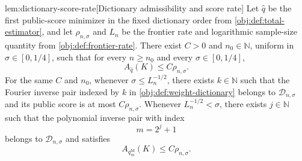 \documentclass[11pt]{article}
\begin{document}
\begin{lemmav}{lem:dictionary-score-rate}[Dictionary admissibility and score rate]
Let \(\widehat q\) be the first public-score minimizer in the fixed dictionary order from \cref{obj:def:total-estimator}, and let \(\rho_{n,\sigma}\) and \(L_n\) be the frontier rate and logarithmic sample-size quantity from \cref{obj:def:frontier-rate}. There exist \(C>0\) and \(n_0\in\mathbb N\), uniform in \(\sigma\in[0,1/4]\), such that for every \(n\ge n_0\) and every \(\sigma\in[0,1/4]\),
\[
A_{\widehat q}(K)\le C\rho_{n,\sigma}.
\]
For the same \(C\) and \(n_0\), whenever \(\sigma\le L_n^{-1/2}\), there exists \(k\in\mathbb N\) such that the Fourier inverse pair indexed by \(k\) in \cref{obj:def:weight-dictionary} belongs to \(\mathcal D_{n,\sigma}\) and its public score is at most \(C\rho_{n,\sigma}\). Whenever \(L_n^{-1/2}<\sigma\), there exists \(j\in\mathbb N\) such that the polynomial inverse pair with index
\[
m=2^j+1
\]
belongs to \(\mathcal D_{n,\sigma}\) and satisfies
\[
A_{q_m^{\mathrm M}}(K)\le C\rho_{n,\sigma}.
\]
\end{lemmav}
\end{document}
